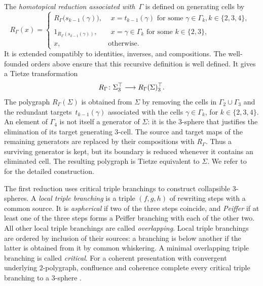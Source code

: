 \documentclass[a4paper, twoside, 11pt, english]{article}
\begin{document}
The \emph{homotopical reduction associated with~$\Gamma$} is defined on
generating cells by
\[
R_\Gamma(x)
=
\begin{cases}
R_\Gamma\bigl(s_{k-1}(\gamma)\bigr),
&
\begin{array}{l}
x=t_{k-1}(\gamma)
\text{ for some }\gamma\in\Gamma_k,
k\in\{2,3,4\},
\end{array}
\\
1_{R_\Gamma(s_{k-1}(\gamma))},
&
\begin{array}{l}
x=\gamma\in\Gamma_k
\text{ for some }k\in\{2,3\},
\end{array}
\\
x,
&
\text{otherwise}.
\end{cases}
\]
It is extended compatibly to identities, inverses, and compositions.
The well-founded orders above ensure that this recursive definition is
well defined. It gives a Tietze transformation
\[
R_\Gamma\colon
\Sigma^{\top}_3
\longrightarrow
R_\Gamma(\Sigma)^{\top}_3.
\]
The polygraph $R_\Gamma(\Sigma)$ is obtained from $\Sigma$ by removing
the cells in $\Gamma_2\cup\Gamma_3$ and the redundant targets~$t_{k-1}(\gamma)$ associated with the cells
$\gamma\in\Gamma_k$, for $k\in\{2,3,4\}$. An element of $\Gamma_4$
is not itself a generator of $\Sigma$: it is the $3$-sphere that
justifies the elimination of its target generating $3$-cell.
The source and target maps of the remaining generators are replaced by
their compositions with $R_\Gamma$. Thus a surviving generator is kept,
but its boundary is reduced whenever it contains an eliminated cell.
The resulting polygraph is Tietze equivalent to $\Sigma$. We refer
to~\cite[Section~2.3.1]{GaussentGuiraudMalbos15} for the detailed
construction.

The first reduction uses critical triple branchings to construct
collapsible $3$-spheres. A \emph{local triple branching} is a triple
$(f,g,h)$ of rewriting steps with a common source. It is
\emph{aspherical} if two of the three steps coincide, and
\emph{Peiffer} if at least one of the three steps forms a Peiffer
branching with each of the other two. All other local triple branchings
are called \emph{overlapping}.
Local triple branchings are ordered by inclusion of their sources: a
branching is below another if the latter is obtained from it by common
whiskering. A minimal overlapping triple branching is called
\emph{critical}. For a coherent presentation with convergent underlying
$2$-polygraph, confluence and coherence complete every critical triple
branching to a $3$-sphere
\cite[Section~2.3.2]{GaussentGuiraudMalbos15}. 
\end{document}
